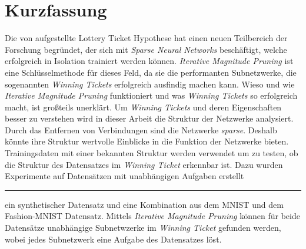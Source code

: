 \chapter*{Kurzfassung}

Die von \textcite{LTH} aufgestellte Lottery Ticket Hypothese hat einen neuen Teilbereich der Forschung begründet, der sich mit \textit{Sparse Neural Networks} beschäftigt, welche erfolgreich in Isolation trainiert werden können.
\textit{Iterative Magnitude Pruning} ist eine Schlüsselmethode für dieses Feld, da sie die performanten Subnetzwerke, die sogenannten \textit{Winning Tickets} erfolgreich ausfindig machen kann.
Wieso und wie \textit{Iterative Magnitude Pruning} funktioniert und was  \textit{Winning Tickets} so erfolgreich macht, ist großteils unerklärt.
Um \textit{Winning Tickets} und deren Eigenschaften besser zu verstehen wird in dieser Arbeit die Struktur der Netzwerke analysiert.
Durch das Entfernen von Verbindungen sind die Netzwerke \textit{sparse}.
Deshalb könnte ihre Struktur wertvolle Einblicke in die Funktion der Netzwerke bieten.
Trainingsdaten mit einer bekannten Struktur werden verwendet um zu testen, ob die Struktur des Datensatzes im \textit{Winning Ticket} erkennbar ist.
Dazu wurden Experimente auf Datensätzen mit unabhängigen Aufgaben erstellt \rule[0.5ex]{.5em}{0.5pt} ein synthetischer Datensatz und eine Kombination aus dem MNIST und dem Fashion-MNIST Datensatz.
Mittels \textit{Iterative Magnitude Pruning} können für beide Datensätze unabhängige Subnetwzerke im \textit{Winning Ticket} gefunden werden, wobei jedes Subnetzwerk eine Aufgabe des Datensatzes löst.